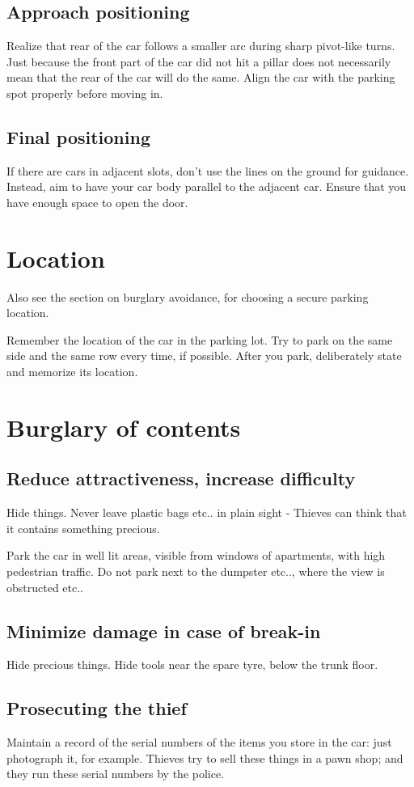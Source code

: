 \documentclass[oneside, article]{memoir}
\begin{document}
\subsection{Approach positioning}
Realize that rear of the car follows a smaller arc during sharp pivot-like turns. Just because the front part of the car did not hit a pillar does not necessarily mean that the rear of the car will do the same. Align the car with the parking spot properly before moving in.

\subsection{Final positioning}
If there are cars in adjacent slots, don't use the lines on the ground for guidance. Instead, aim to have your car body parallel to the adjacent car. Ensure that you have enough space to open the door.

\section{Location}
Also see the section on burglary avoidance, for choosing a secure parking location.

Remember the location of the car in the parking lot.
\subitem Try to park on the same side and the same row every time, if possible.
\subitem After you park, deliberately state and memorize its location.

\section{Burglary of contents}
\subsection{Reduce attractiveness, increase difficulty}
Hide things. Never leave plastic bags etc.. in plain sight - Thieves can think that it contains something precious.

Park the car in well lit areas, visible from windows of apartments, with high pedestrian traffic. Do not park next to the dumpster etc.., where the view is obstructed etc..

\subsection{Minimize damage in case of break-in}
Hide precious things. Hide tools near the spare tyre, below the trunk floor.

\subsection{Prosecuting the thief}
Maintain a record of the serial numbers of the items you store in the car: just photograph it, for example. Thieves try to sell these things in a pawn shop; and they run these serial numbers by the police.
\end{document}
